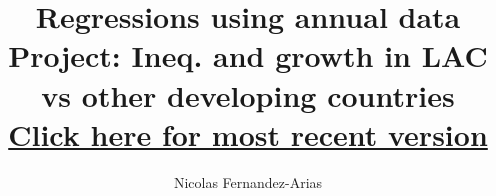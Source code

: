 \documentclass[12pt,english]{article}
\theoremstyle{remark}
\begin{document}
	
	\title{Regressions using annual data\\ \small Project: Ineq. and growth in LAC vs other developing countries \\ \href{.}{Click here for most recent version}}
	\author{Nicolas Fernandez-Arias}
	\maketitle









\footnotesize 



\footnotesize

\normalsize

\footnotesize

\normalsize

\footnotesize

\normalsize

\scriptsize

\scriptsize

\scriptsize

\scriptsize



















\end{document}
